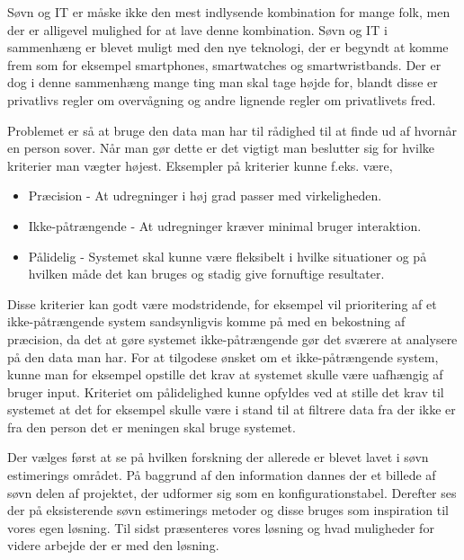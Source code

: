 \begin{comment}
Dette kapitel indeholder forskning omkring søvn, hvor forskellige metoder til at detektere søvn bliver beskrevet.
Hvorefter metoderne bliver sammenlignet med hinanden for at se på hvilket metoder vil kunne bruges til dette projekt.
Til slut vil der blive set på en enkelt metode i dybden som et proof of concept.
\end{comment}
Søvn og IT er måske ikke den mest indlysende kombination for mange folk, men der er alligevel mulighed for at lave denne kombination.
Søvn og IT i sammenhæng er blevet muligt med den nye teknologi, der er begyndt at komme frem som for eksempel smartphones, smartwatches og smartwristbands.
Der er dog i denne sammenhæng mange ting man skal tage højde for, blandt disse er privatlivs regler om overvågning og andre lignende regler om privatlivets fred.

Problemet er så at bruge den data man har til rådighed til at finde ud af hvornår en person sover.
Når man gør dette er det vigtigt man beslutter sig for hvilke kriterier man vægter højest.
Eksempler på kriterier kunne f.eks. være,

\begin{itemize}
	\item Præcision - At udregninger i høj grad passer med virkeligheden.
	\item Ikke-påtrængende - At udregninger kræver minimal bruger interaktion.
	\item Pålidelig - Systemet skal kunne være fleksibelt i hvilke situationer og på hvilken måde det kan bruges og stadig give fornuftige resultater.
\end{itemize}


Disse kriterier kan godt være modstridende, for eksempel vil prioritering af et ikke-påtrængende system sandsynligvis komme på med en bekostning af præcision, da det at gøre systemet ikke-påtrængende gør det sværere at analysere på den data man har.
For at tilgodese ønsket om et ikke-påtrængende system, kunne man for eksempel opstille det krav at systemet skulle være uafhængig af bruger input.
Kriteriet om pålidelighed kunne opfyldes ved at stille det krav til systemet at det for eksempel skulle være i stand til at filtrere data fra der ikke er fra den person det er meningen skal bruge systemet.

Der vælges først at se på hvilken forskning der allerede er blevet lavet i søvn estimerings området.
På baggrund af den information dannes der et billede af søvn delen af projektet, der udformer sig som en konfigurationstabel.
Derefter ses der på eksisterende søvn estimerings metoder og disse bruges som inspiration til vores egen løsning.
Til sidst præsenteres vores løsning og hvad muligheder for videre arbejde der er med den løsning. 



